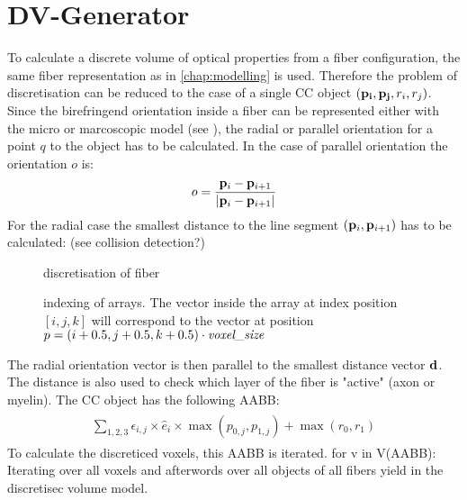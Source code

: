 \section{DV-Generator}
\label{sec:dv_generator}
% 
To calculate a discrete volume of optical properties from a fiber configuration, the same fiber representation as in \cref{chap:modelling} is used.
Therefore the problem of discretisation can be reduced to the case of a single \ac{CC} object $(\mathbf{p_i}, \mathbf{p_{j}}, r_i, r_{j})$.
% 
Since the birefringend orientation inside a fiber can be represented either with the micro or marcoscopic model (see \dummy{}), the radial or parallel orientation for a point $q$ to the object has to be calculated.
In the case of parallel orientation the orientation $o$ is:
\begin{align}
\begin{split}
    o = \frac{\mathbf{p}_i - \mathbf{p}_{i+1}}{\lvert\mathbf{p}_i - \mathbf{p}_{i+1}\rvert}
\end{split}
\end{align}
% 
For the radial case the smallest distance to the line segment $(\mathbf{p}_i,\mathbf{p}_{i+1})$ has to be calculated:
(see collision detection?)
% 
\begin{figure}[!t]
\centering
\def\tikzwidth{0.625\textwidth}
\caption{discretisation of fiber}
\label{fig:fiber_discretisation}
\end{figure}
% 
\begin{figure}[!tb]
\centering
\def\tikzwidth{0.33\textwidth}
\caption{indexing of arrays.
The vector inside the array at index position $[i,j,k]$ will correspond to the vector at position $p=(i+0.5,j+0.5,k+0.5)\cdot \mathit{\textit{voxel\_size}}$}
\label{fig:indexing_array}
\end{figure}
% 
The radial orientation vector is then parallel to the smallest distance vector $\mathbf{d}$.
The distance is also used to check which layer of the fiber is "active" (\eg axon or myelin). 
% 
The \ac{CC} object has the following \ac{AABB}:
\begin{align}
\begin{split}
    \sum_{1,2,3} \epsilon_{i,j} \times \hat{e}_i \times \max(p_{0,j}, p_{1,j}) + \max(r_0, r_1)
\end{split}
\end{align}
To calculate the discreticed voxels, this \ac{AABB} is iterated. for v in V(AABB): \dummy{}
% 
Iterating over all voxels and afterwords over all objects of all fibers yield in the discretisec volume model.\\
